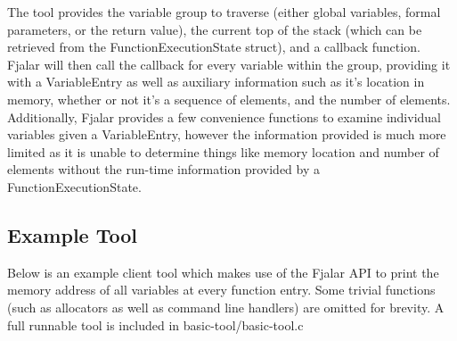 \documentclass[11pt]{article}
\begin{document}
The tool provides the variable group to traverse (either global
variables, formal parameters, or the return value), the current top of
the stack (which can be retrieved from the FunctionExecutionState
struct),  and a callback function. Fjalar will then call the callback for every variable within
the group, providing it with a VariableEntry as well as auxiliary
information such as it's location in memory, whether or not it's a
sequence of elements, and the number of elements. Additionally,
Fjalar provides a few convenience functions to examine individual
variables given a VariableEntry, however the information provided is
much more limited as it is unable to determine things like memory
location and number of elements without the run-time information
provided by a FunctionExecutionState.

\subsection{Example Tool}

Below is an example client tool which makes use of the Fjalar API to print
the memory address of all variables at every function entry. Some
trivial functions (such as allocators as well as command line
handlers) are omitted for brevity. A full runnable tool is included in
basic-tool/basic-tool.c 
\end{document}
